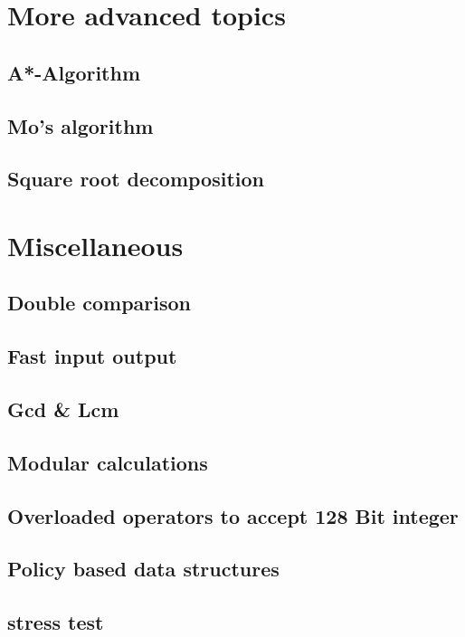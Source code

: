 \section{More advanced topics}
\subsection{A*-Algorithm}
\raggedbottom
\hrulefill
\subsection{Mo's algorithm}
\raggedbottom
\hrulefill
\subsection{Square root decomposition}
\raggedbottom
\hrulefill


\section{Miscellaneous}
\subsection{Double comparison}
\raggedbottom
\hrulefill
\subsection{Fast input output}
\raggedbottom
\hrulefill
\subsection{Gcd \& Lcm}
\raggedbottom
\hrulefill
\subsection{Modular calculations}
\raggedbottom
\hrulefill
\subsection{Overloaded operators to accept 128 Bit integer}
\raggedbottom
\hrulefill
\subsection{Policy based data structures}
\raggedbottom
\hrulefill
\subsection{stress test}
\raggedbottom
\hrulefill
